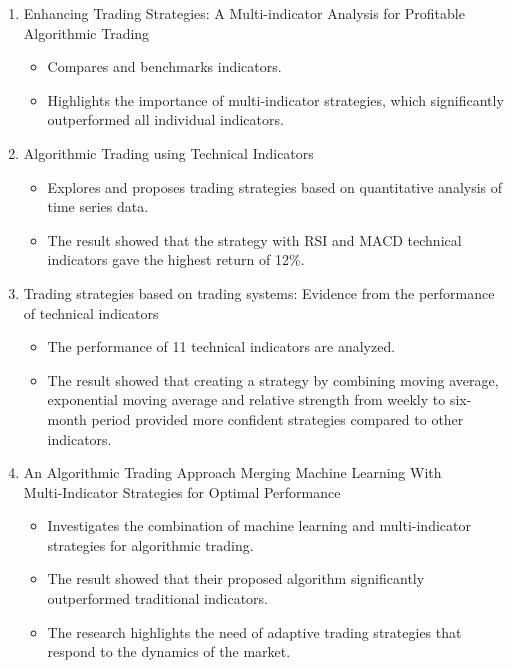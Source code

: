 \begin{enumerate}

    \item Enhancing Trading Strategies: A Multi-indicator Analysis for Profitable Algorithmic Trading
    \cite{sukma2025enhancing}
    \begin{itemize}
        \item Compares and benchmarks indicators.
        \item Highlights the importance of multi-indicator strategies, which significantly outperformed all individual indicators.
    \end{itemize}

    \item Algorithmic Trading using Technical Indicators
    \cite{salkar2021algorithmic}
    \begin{itemize}
        \item Explores and proposes trading strategies based on quantitative analysis of time series data.
        \item The result showed that the strategy with RSI and MACD technical indicators gave the highest return of 12\%.
    \end{itemize}

    \item Trading strategies based on trading systems: Evidence from the performance of
technical indicators
    \cite{keshavarz2022trading}
    \begin{itemize}
        \item The performance of 11 technical indicators are analyzed.
        \item The result showed that creating a strategy by combining moving average, exponential moving average and relative strength from weekly to six-month period provided more confident strategies compared to other indicators.
    \end{itemize}

    \item An Algorithmic Trading Approach Merging Machine Learning With\\
    Multi-Indicator Strategies for Optimal Performance
    \cite{10795119}
    \begin{itemize}
        \item Investigates the combination of machine learning and multi-indicator strategies for algorithmic trading.
        \item The result showed that their proposed algorithm significantly outperformed traditional indicators.
        \item The research highlights the need of adaptive trading strategies that respond to the dynamics of the market.
    \end{itemize}


\end{enumerate}
